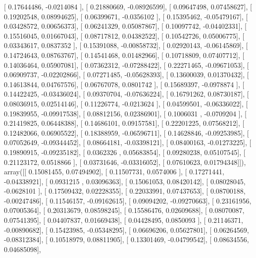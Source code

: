 \documentclass{article}
\begin{document}
       [ 0.17644486, -0.0214084 ],
       [ 0.21880669, -0.08926599],
       [ 0.09647498,  0.07458627],
       [ 0.19202548,  0.08994625],
       [ 0.06399671, -0.0356102 ],
       [ 0.15395462, -0.05479167],
       [ 0.03428572,  0.00656373],
       [ 0.06241329,  0.05087867],
       [ 0.10097742, -0.04402331],
       [ 0.15516045,  0.01667043],
       [ 0.08717812,  0.04382522],
       [ 0.10542726,  0.05006775],
       [ 0.03343617,  0.0837352 ],
       [ 0.15391088, -0.00858732],
       [ 0.02920143, -0.06145869],
       [ 0.14724643,  0.08763767],
       [ 0.14541468,  0.01482966],
       [ 0.10718809,  0.07407712],
       [ 0.14036464,  0.05907081],
       [ 0.07362312, -0.07288422],
       [ 0.22271465, -0.09671053],
       [ 0.06909737, -0.02202866],
       [ 0.07271485, -0.05628393],
       [ 0.13600039,  0.01370432],
       [ 0.14613844,  0.04767576],
       [ 0.06767078,  0.0801742 ],
       [ 0.15689397, -0.0978874 ],
       [ 0.14422425, -0.03436024],
       [ 0.09370704, -0.07636224],
       [ 0.16791262,  0.08730187],
       [ 0.08036915,  0.02514146],
       [ 0.11226774, -0.0213624 ],
       [ 0.04599501, -0.06336022],
       [ 0.19839955, -0.09917538],
       [ 0.08812156,  0.02386901],
       [ 0.1006031 , -0.0709204 ],
       [ 0.21419825,  0.06448388],
       [ 0.14686101,  0.09157581],
       [ 0.22201225,  0.07568212],
       [ 0.12482066,  0.06905522],
       [ 0.18388959, -0.06596711],
       [ 0.14628846, -0.09253985],
       [ 0.07052649, -0.09344452],
       [ 0.08664181, -0.03398121],
       [ 0.08400163, -0.01273225],
       [ 0.19890915, -0.09235182],
       [ 0.0362326 ,  0.05683854],
       [ 0.09280238,  0.05107545],
       [ 0.21123172,  0.0518866 ],
       [ 0.03731646, -0.03316052],
       [ 0.07610623,  0.01794348]]), array([[ 0.15081455,  0.07494902],
       [ 0.11507731,  0.0574006 ],
       [ 0.17271441, -0.04338921],
       [ 0.0931215 ,  0.03096363],
       [ 0.15061053,  0.08420142],
       [ 0.08028045, -0.0628101 ],
       [ 0.17509432,  0.02228355],
       [ 0.22033991,  0.07437653],
       [ 0.08700188, -0.00247486],
       [ 0.11546157, -0.09162615],
       [ 0.09094202, -0.09270663],
       [ 0.23161956,  0.07005364],
       [ 0.20313679,  0.08598245],
       [ 0.15586476,  0.02609688],
       [ 0.08070087,  0.07541395],
       [ 0.04407837,  0.01669438],
       [ 0.04428495,  0.0850093 ],
       [ 0.21146371, -0.00890682],
       [ 0.15423985, -0.05348295],
       [ 0.06696206,  0.05627801],
       [ 0.06264569, -0.08312384],
       [ 0.10518979,  0.08811905],
       [ 0.13301469, -0.04799542],
       [ 0.08634556,  0.04685098],
\end{document}
